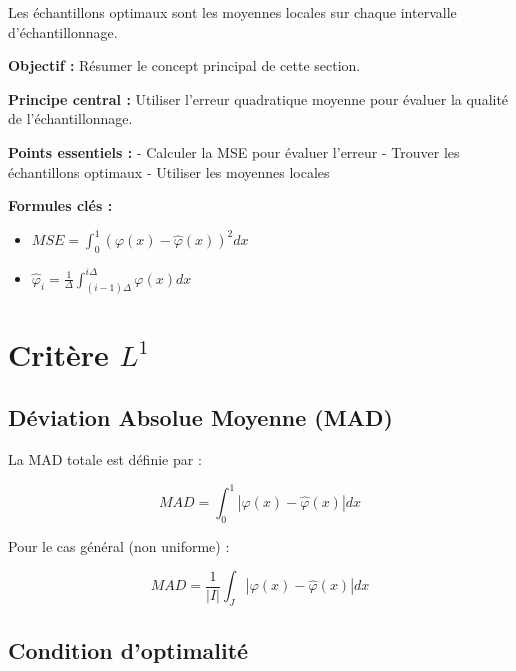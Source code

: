 \documentclass[12pt]{article}
\begin{document}
Les échantillons optimaux sont les moyennes locales sur chaque intervalle d'échantillonnage.

\begin{tcolorbox}[colback=red!5!white, colframe=red!75!black, title={\faBookmark\hspace{0.5em}Fiche Récapitulative}]
  
\textbf{Objectif :} Résumer le concept principal de cette section.

\textbf{Principe central :} Utiliser l'erreur quadratique moyenne pour évaluer la qualité de l'échantillonnage.

\vspace{0.4em}
\textbf{Points essentiels :}  
- Calculer la MSE pour évaluer l'erreur
- Trouver les échantillons optimaux
- Utiliser les moyennes locales

\vspace{0.4em}
\textbf{Formules clés :}  
\begin{itemize}
\item $MSE = \int_0^1 (\varphi(x) - \hat{\varphi}(x))^2 dx$
\item $\hat{\varphi}_i = \frac{1}{\Delta} \int_{(i-1)\Delta}^{i\Delta} \varphi(x) dx$
\end{itemize}

\end{tcolorbox}

\newpage

\section{Critère $L^1$}

\subsection{Déviation Absolue Moyenne (MAD)}

La MAD totale est définie par :

\begin{equation}
MAD = \int_0^1 |\varphi(x) - \hat{\varphi}(x)| dx
\end{equation}

Pour le cas général (non uniforme) :

\begin{equation}
MAD = \frac{1}{|I|} \int_J |\varphi(x) - \hat{\varphi}(x)| dx
\end{equation}

\subsection{Condition d'optimalité}
\end{document}
